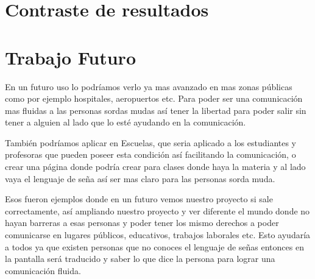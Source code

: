 \documentclass[letter,12pt]{report}
\begin{document}
\section{Contraste de resultados}

\lipsum[1]%

\section{Trabajo Futuro}
En un futuro uso lo podríamos verlo ya mas avanzado en mas zonas públicas como por ejemplo hospitales, aeropuertos etc. Para poder ser una comunicación mas fluidas a las personas sordas mudas así tener la libertad para poder salir sin tener a alguien al lado que lo esté ayudando en la comunicación.


También podríamos aplicar en Escuelas, que seria aplicado a los estudiantes y profesoras que pueden poseer esta condición así facilitando la comunicación, o crear una página donde podría crear para clases donde haya la materia y al lado vaya el lenguaje de seña así ser mas claro para las personas sorda muda.


Esos fueron ejemplos donde en un futuro vemos nuestro proyecto si sale correctamente, así ampliando nuestro proyecto y ver diferente el mundo donde no hayan barreras a esas personas y poder tener los mismo derechos a poder comunicarse en lugares públicos, educativos, trabajos laborales etc. Esto ayudaría a todos ya que existen personas que no conoces el lenguaje de señas entonces en la pantalla será traducido y saber lo que dice la persona para lograr una comunicación fluida.

\lipsum[1]%









\end{document}

